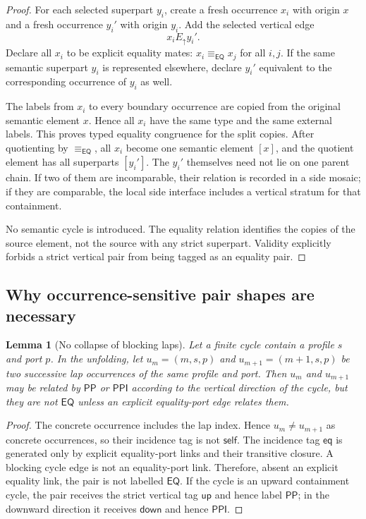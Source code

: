 \documentclass[11pt]{article}
\newtheorem{lemma}[theorem]{Lemma}
\newcommand{\EQ}{\mathsf{EQ}}
\newcommand{\PP}{\mathsf{PP}}
\newcommand{\PPI}{\mathsf{PPI}}
\newcommand{\eqc}{\equiv_{\EQ}}
\newcommand{\up}{\mathsf{up}}
\newcommand{\down}{\mathsf{down}}
\newcommand{\self}{\mathsf{self}}
\newcommand{\eqtag}{\mathsf{eq}}
\begin{document}
\begin{proof}
For each selected superpart $y_i$, create a fresh occurrence $x_i$ with origin $x$ and a fresh occurrence $y_i'$ with origin $y_i$.  Add the selected vertical edge
\[
   x_i E_\uparrow y_i'.
\]
Declare all $x_i$ to be explicit equality mates: $x_i\eqc x_j$ for all $i,j$.  If the same semantic superpart $y_i$ is represented elsewhere, declare $y_i'$ equivalent to the corresponding occurrence of $y_i$ as well.

The labels from $x_i$ to every boundary occurrence are copied from the original semantic element $x$.  Hence all $x_i$ have the same type and the same external labels.  This proves typed equality congruence for the split copies.  After quotienting by $\eqc$, all $x_i$ become one semantic element $[x]$, and the quotient element has all superparts $[y_i']$.  The $y_i'$ themselves need not lie on one parent chain.  If two of them are incomparable, their relation is recorded in a side mosaic; if they are comparable, the local side interface includes a vertical stratum for that containment.

No semantic cycle is introduced.  The equality relation identifies the copies of the source element, not the source with any strict superpart.  Validity explicitly forbids a strict vertical pair from being tagged as an equality pair.
\end{proof}

\subsection{Why occurrence-sensitive pair shapes are necessary}

\begin{lemma}[No collapse of blocking laps]\label{lem:no-collapse-laps}
Let a finite cycle contain a profile $s$ and port $p$.  In the unfolding, let $u_m=(m,s,p)$ and $u_{m+1}=(m+1,s,p)$ be two successive lap occurrences of the same profile and port.  Then $u_m$ and $u_{m+1}$ may be related by $\PP$ or $\PPI$ according to the vertical direction of the cycle, but they are not $\EQ$ unless an explicit equality-port edge relates them.
\end{lemma}

\begin{proof}
The concrete occurrence includes the lap index.  Hence $u_m\ne u_{m+1}$ as concrete occurrences, so their incidence tag is not $\self$.  The incidence tag $\eqtag$ is generated only by explicit equality-port links and their transitive closure.  A blocking cycle edge is not an equality-port link.  Therefore, absent an explicit equality link, the pair is not labelled $\EQ$.  If the cycle is an upward containment cycle, the pair receives the strict vertical tag $\up$ and hence label $\PP$; in the downward direction it receives $\down$ and hence $\PPI$.
\end{proof}
\end{document}
